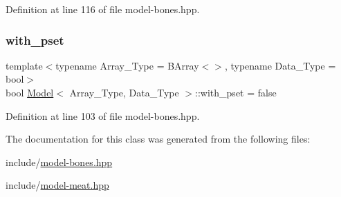 Definition at line 116 of file model-\/bones.\+hpp.

\mbox{\label{class_model_ab970956dc7f7977f45c022beb388cf5b}} 
\subsubsection{\texorpdfstring{with\+\_\+pset}{with\_pset}}
{\footnotesize\ttfamily template$<$typename Array\+\_\+\+Type  = B\+Array$<$$>$, typename Data\+\_\+\+Type  = bool$>$ \\
bool \hyperlink{class_model}{Model}$<$ Array\+\_\+\+Type, Data\+\_\+\+Type $>$\+::with\+\_\+pset = false}



Definition at line 103 of file model-\/bones.\+hpp.



The documentation for this class was generated from the following files\+:\begin{DoxyCompactItemize}
\item 
include/\hyperlink{model-bones_8hpp}{model-\/bones.\+hpp}\item 
include/\hyperlink{model-meat_8hpp}{model-\/meat.\+hpp}\end{DoxyCompactItemize}
